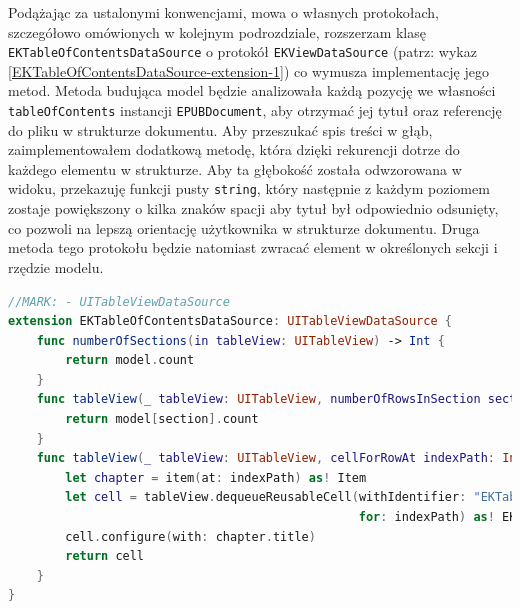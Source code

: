 Podążając za ustalonymi konwencjami, mowa o własnych protokołach, szczegółowo omówionych w kolejnym podrozdziale, rozszerzam klasę \texttt{EKTableOfContentsDataSource} o protokół \texttt{EKViewDataSource} (patrz: wykaz \ref{EKTableOfContentsDataSource-extension-1}) co wymusza implementację jego metod. Metoda budująca model będzie analizowała każdą pozycję we własności \texttt{tableOfContents} instancji \texttt{EPUBDocument}, aby otrzymać jej tytuł oraz referencję do pliku w strukturze dokumentu. Aby przeszukać spis treści w głąb, zaimplementowałem dodatkową metodę, która dzięki rekurencji dotrze do każdego elementu w strukturze. Aby ta głębokość została odwzorowana w widoku, przekazuję funkcji pusty \texttt{string}, który następnie z każdym poziomem zostaje powiększony o kilka znaków spacji aby tytuł był odpowiednio odsunięty, co pozwoli na lepszą orientację użytkownika w strukturze dokumentu. Druga metoda tego protokołu będzie natomiast zwracać element w określonych sekcji i rzędzie modelu.

\begin{lstlisting}[language=swift,caption={Rozszerzenie klasy \texttt{EKTableOfContentsDataSource} o protokół \texttt{UITableViewDataSource}}, label=EKTableOfContentsDataSource-extension-2]
//MARK: - UITableViewDataSource
extension EKTableOfContentsDataSource: UITableViewDataSource {
    func numberOfSections(in tableView: UITableView) -> Int {
        return model.count
    }
    func tableView(_ tableView: UITableView, numberOfRowsInSection section: Int) -> Int {
        return model[section].count
    }
    func tableView(_ tableView: UITableView, cellForRowAt indexPath: IndexPath) -> UITableViewCell {
        let chapter = item(at: indexPath) as! Item
        let cell = tableView.dequeueReusableCell(withIdentifier: "EKTableOfContentsViewCell" ,
                                                 for: indexPath) as! EKTableOfContentsViewCell
        cell.configure(with: chapter.title)
        return cell
    }
}
\end{lstlisting}

